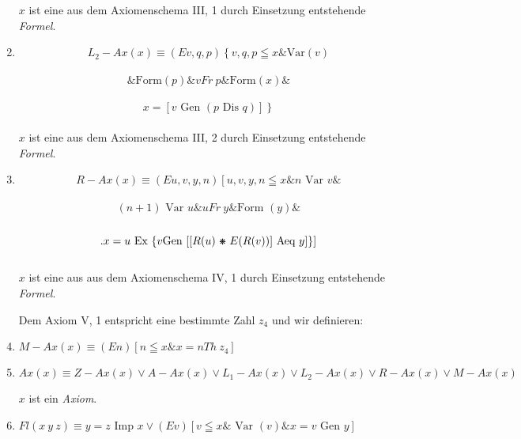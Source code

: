 \documentclass[draft]{scrartcl}
\begin{document}
\begin{enumerate}[1.]
	$x$ ist eine aus dem Axiomenschema III, 1 durch Einsetzung entstehende \textit{Formel}.

	\item $$
		L_2 - Ax\left(x\right) \equiv \left(Ev, q, p\right) \left\{v, q, p \leqq x \& \text{Var}\left(v\right)\right.
	$$\\[\spacebetweenbreakedequations]
	$$
		\left.\& \text{Form}\left(p\right) \& v Fr\ p \& \text{Form}\left(x\right) \&\right.
	$$\\[\spacebetweenbreakedequations]
	$$
		\left.x = \left[v \text{ Gen } \left(p\text{ Dis } q\right)\right]\right\}
	$$\\[\spaceafterbreakedequation]
	$x$ ist eine aus dem Axiomenschema III, 2 durch Einsetzung entstehende \textit{Formel}.

	\item $$
		R - Ax\left(x\right) \equiv \left(Eu, v, y, n\right) \left[u, v, y, n \leqq x \& n \text{ Var } v \& \right.
	$$\\[\spacebetweenbreakedequations]
	$$
		\left(n + 1\right) \text{ Var } u \&  u Fr\ y \& \text{Form }\left(y\right) \&
	$$\\[\spacebetweenbreakedequations]
	$$
		\left.x = u\text{ Ex } \left\{v \text{Gen } \left[\left[R\left(u\right) \pmstar E\left(R\left(v\right)\right)\right] \text{ Aeq } y \right]\right\} \right]
	$$\\[\spaceafterbreakedequation]

	$x$ ist eine aus aus dem Axiomenschema IV, 1 durch
	Einsetzung entstehende \textit{Formel}.

	Dem Axiom V, 1 entspricht eine bestimmte Zahl $z_4$ und wir definieren:

	\item $M - Ax\left(x\right) \equiv \left(En\right) \left[n \leqq x \& x = n Th\ z_4\right]$%

	\item $Ax\left(x\right) \equiv Z - Ax\left(x\right) \lor A - Ax\left(x\right) \lor L_1 - Ax\left(x\right) \lor L_2 - Ax\left(x\right) \lor R - Ax\left(x\right) \lor M - Ax\left(x\right)$

	$x$ ist ein \textit{Axiom}.

	\item $Fl\left(x\ y\ z\right) \equiv y = z \text{ Imp } x \lor \left(Ev\right) \left[ v \leqq x \& \text{ Var }\left(v\right) \& x = v \text{ Gen } y\right]$


\end{enumerate}
\end{document}

